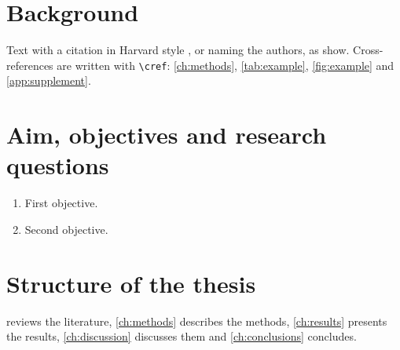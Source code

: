\section{Background}\label{sec:background}
Text with a citation in Harvard style \citep{page2021}, or naming the authors, as \citet{roberts2017} show.
Cross-references are written with \verb|\cref|: \cref{ch:methods}, \cref{tab:example}, \cref{fig:example} and
\cref{app:supplement}.

\section{Aim, objectives and research questions}\label{sec:aims}
\begin{enumerate}[label=O\arabic*.]
  \item First objective.
  \item Second objective.
\end{enumerate}

\section{Structure of the thesis}\label{sec:structure}
 reviews the literature, \cref{ch:methods} describes the methods, \cref{ch:results} presents the
results, \cref{ch:discussion} discusses them and \cref{ch:conclusions} concludes.
